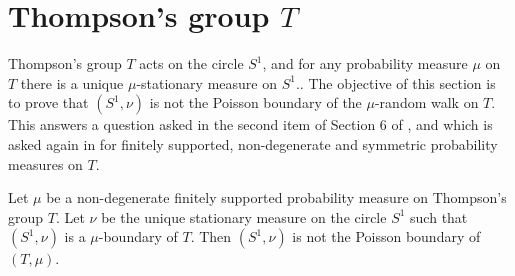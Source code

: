 \section{Thompson's group $T$}
Thompson's group $T$ acts on the circle $S^1$, and for any probability measure $\mu$ on $T$ there is a unique $\mu$-stationary measure on $S^1$.. The objective of this section is to prove that $(S^1,\nu)$ is not the Poisson boundary of the $\mu$-random walk on $T$. This answers a question asked in the second item of Section 6 of \cite{Deroin2013}, and which is asked again in \cite[Question 19]{Navas2018} for finitely supported, non-degenerate and symmetric probability measures on $T$.


\begin{thm}\label{thm: main thm circle Thompson}
Let $\mu$ be a non-degenerate finitely supported probability measure on Thompson's group $T$. Let $\nu$ be the unique stationary measure on the circle $S^1$ such that $(S^1,\nu)$ is a $\mu$-boundary of $T$. Then $(S^1,\nu)$ is not the Poisson boundary of $(T,\mu)$.
\end{thm}